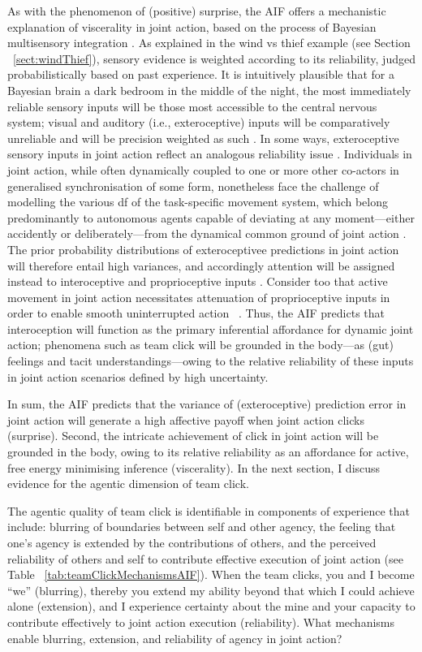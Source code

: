 \begin{CJK}{UTF8}{gbsn}
As with the phenomenon of (positive) surprise, the AIF offers a mechanistic explanation of viscerality in joint action, based on the process of Bayesian multisensory integration \citep{Ernst2004}.  As explained in the wind vs thief example (see Section ~\ref{sect:windThief}), sensory evidence is weighted according to its reliability, judged probabilistically based on past experience.  It is intuitively plausible that for a Bayesian brain a dark bedroom in the middle of the night, the most immediately reliable sensory inputs will be those most accessible to the central nervous system; visual and auditory (i.e., exteroceptive) inputs will be comparatively unreliable and will be precision weighted as such \citep{Pezzulo2014}.  In some ways, exteroceptive sensory inputs in joint action reflect an analogous reliability issue \citep{Sebanz2009}. Individuals in joint action, while often dynamically coupled to one or more other co-actors in generalised synchronisation of some form, nonetheless face the challenge of modelling the various df of the task-specific movement system, which belong predominantly to autonomous agents capable of deviating at any moment---either accidently or deliberately---from the dynamical common ground of joint action \citep{Keller2016}.  The prior probability distributions of exteroceptivee predictions in joint action will therefore entail high variances, and accordingly attention will be assigned instead to interoceptive and proprioceptive inputs \citep{Seth2013}.  Consider too that active movement in joint action necessitates attenuation of proprioceptive inputs in order to enable smooth uninterrupted action ~\cite{Dietrich2004a,Friston2015}.  Thus, the AIF predicts that interoception will function as the primary inferential affordance for dynamic joint action; phenomena such as team click will be grounded in the body---as (gut) feelings and tacit understandings---owing to the relative reliability of these inputs in joint action scenarios defined by high uncertainty.

In sum, the AIF predicts that the variance of (exteroceptive) prediction error in joint action will generate a high affective payoff when joint action clicks (surprise).  Second, the intricate achievement of click in joint action will be grounded in the body, owing to its relative reliability as an affordance for active, free energy minimising inference (viscerality).  In the next section, I discuss evidence for the agentic dimension of team click.

The agentic quality of team click is identifiable in components of experience that include: blurring of boundaries between self and other agency, the feeling that one's agency is extended by the contributions of others, and the perceived reliability of others and self to contribute effective execution of joint action (see Table ~\ref{tab:teamClickMechanismsAIF}).  When the team clicks, you and I become ``we'' (blurring), thereby you extend my ability beyond that which I could achieve alone (extension), and I experience certainty about the mine and your capacity to contribute effectively to joint action execution (reliability).  What mechanisms enable blurring, extension, and reliability of agency in joint action?


\end{CJK}
